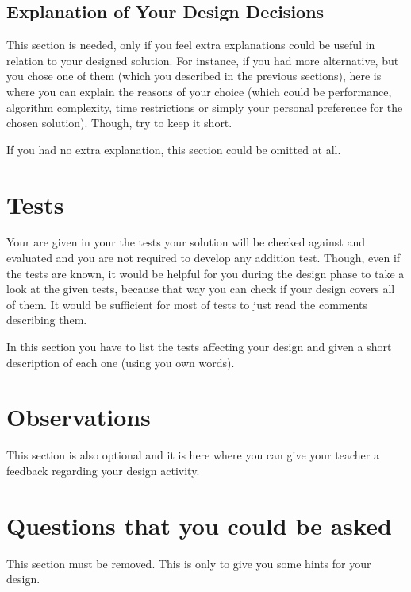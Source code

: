 \subsection{Explanation of Your Design Decisions}

This section is needed, only if you feel extra explanations could be useful in relation to your designed solution. For instance, if you had more alternative, but you chose one of them (which you described in the previous sections), here is where you can explain the reasons of your choice (which could be performance, algorithm complexity, time restrictions or simply your personal preference for the chosen solution). Though, try to keep it short. 

If you had no extra explanation, this section could be omitted at all. 

\section{Tests}

Your are given in your \OSName{} the tests your solution will be checked against and evaluated and you are not required to develop any addition test. Though, even if the tests are known, it would be helpful for you during the design phase to take a look at the given tests, because that way you can check if your design covers all of them. It would be sufficient for most of tests to just read the comments describing them.

In this section you have to list the tests affecting your design and given a short description of each one (using you own words).


\section{Observations}

This section is also optional and it is here where you can give your teacher a feedback regarding your design activity.


\section{Questions that you could be asked}

This section must be removed. This is only to give you some hints for your design. 

